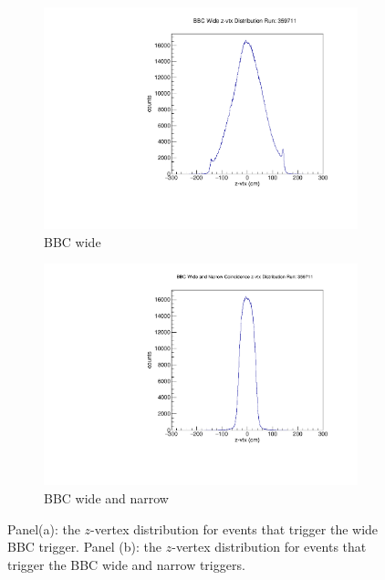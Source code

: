 \begin{figure}
  \centering
  \begin{subfigure}[b]{0.7\linewidth}
    \includegraphics[width=\textwidth]{./figures/bbc_wide_zvtx.pdf}
    \caption{BBC wide}
    \label{fig:bbc_novtx_cut}
  \end{subfigure}
  \begin{subfigure}[b]{0.7\linewidth}
    \includegraphics[width=\textwidth]{./figures/bbc_wide_and_narrow_zvtx.pdf}
    \caption{BBC wide and narrow}
    \label{fig:bbc_simultaneous}
  \end{subfigure}
  \caption{
    Panel(a): the $z$-vertex distribution for events that trigger the wide BBC
    trigger. Panel (b): the $z$-vertex distribution for events that trigger the
    BBC wide and narrow triggers.
  }
  \label{fig:bbc_acc_figures}
\end{figure}

